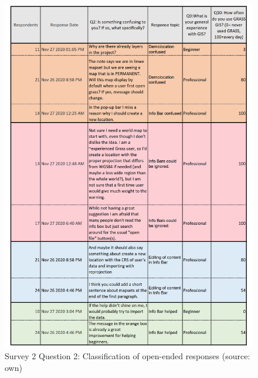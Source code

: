 \documentclass[a4paper,10pt,twoside]{article}
\begin{document}
\newpage
\vspace{0.3cm}
\begin{figure}[hbt!] 
\begin{center}
\includegraphics[width=15.5cm]{../surveys/analyzed_data/survey2_question2.png} 
\caption[Survey 2 Question 2: Classification of open-ended responses]{Survey 2 Question 2: Classification of open-ended responses (source: own)}
\label{fig:survey2_question2}
\end{center}
\end{figure}
\end{document}
